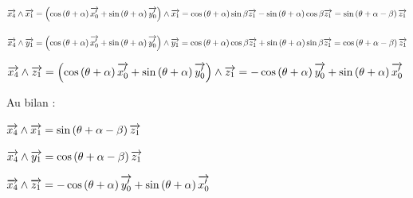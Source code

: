 \documentclass[10pt,fleqn]{article} %
\begin{document}
$\overrightarrow{x_4} \wedge \overrightarrow{x_1} 
= \left( \cos \left(\theta + \alpha \right)\overrightarrow{x_0'} + \sin \left(\theta + \alpha \right)\overrightarrow{y_0'} \right)\wedge \overrightarrow{x_1}
= \cos \left(\theta + \alpha \right)\sin\beta  \overrightarrow{z_1} - \sin \left(\theta + \alpha \right)\cos\beta \overrightarrow{z_1}
= \sin \left(\theta + \alpha -\beta\right) \overrightarrow{z_1} $


$\overrightarrow{x_4} \wedge \overrightarrow{y_1} = \left( \cos \left(\theta + \alpha \right)\overrightarrow{x_0'} + \sin \left(\theta + \alpha \right)\overrightarrow{y_0'} \right)\wedge \overrightarrow{y_1}
=  \cos \left(\theta + \alpha \right)\cos\beta\overrightarrow{z_1} + \sin \left(\theta + \alpha \right)\sin \beta  \overrightarrow{z_1}
=  \cos \left(\theta + \alpha -\beta\right)\overrightarrow{z_1}$

$\overrightarrow{x_4} \wedge \overrightarrow{z_1} = \left( \cos \left(\theta + \alpha \right)\overrightarrow{x_0'} + \sin \left(\theta + \alpha \right)\overrightarrow{y_0'} \right)\wedge \overrightarrow{z_1} 
=  -\cos \left(\theta + \alpha \right)\overrightarrow{y_0'} + \sin \left(\theta + \alpha \right)\overrightarrow{x_0'}$


Au bilan : 

$\overrightarrow{x_4} \wedge \overrightarrow{x_1} 
= \sin \left(\theta + \alpha -\beta\right) \overrightarrow{z_1} $


$\overrightarrow{x_4} \wedge \overrightarrow{y_1}
=  \cos \left(\theta + \alpha -\beta\right)\overrightarrow{z_1}$

$\overrightarrow{x_4} \wedge \overrightarrow{z_1} =
 -\cos \left(\theta + \alpha \right)\overrightarrow{y_0'} + \sin \left(\theta + \alpha \right)\overrightarrow{x_0'}$
\end{document}
